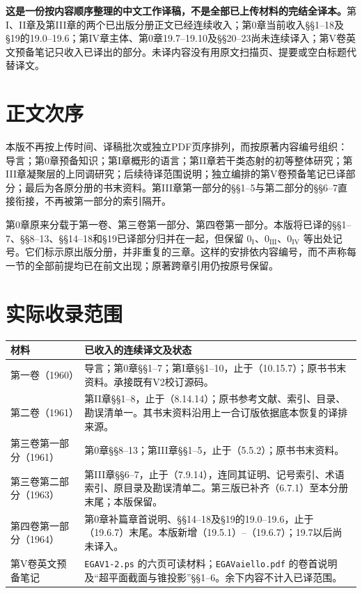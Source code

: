 \maketitle
{}
\noindent\textbf{这是一份按内容顺序整理的中文工作译稿，不是全部已上传材料的完结全译本。}第I、II章及第III章的两个已出版分册正文已经连续收入；第0章当前收入§§1--18及§19的19.0--19.6；第IV章主体、第0章19.7--19.10及§§20--23尚未连续译入；第V卷英文预备笔记只收入已译出的部分。未译内容没有用原文扫描页、提要或空白标题代替译文。

\section*{正文次序}
本版不再按上传时间、译稿批次或独立PDF页序排列，而按原著内容编号组织：导言；第0章预备知识；第I章概形的语言；第II章若干类态射的初等整体研究；第III章凝聚层的上同调研究；后续待译范围说明；独立编排的第V卷预备笔记已译部分；最后为各原分册的书末资料。第III章第一部分的§§1--5与第二部分的§§6--7直接衔接，不再被第一部分的索引隔开。

第0章原来分载于第一卷、第三卷第一部分、第四卷第一部分。本版将已译的§§1--7、§§8--13、§§14--18和§19已译部分归并在一起，但保留 $0_{\mathrm I}$、$0_{\mathrm{III}}$、$0_{\mathrm{IV}}$ 等出处记号。它们标示原出版分册，并非重复的三章。这样的安排依内容编号，而不声称每一节的全部前提均已在前文出现；原著跨章引用仍按原号保留。

\section*{实际收录范围}
\begin{longtable}{@{}p{.25\linewidth}p{.67\linewidth}@{}}
\toprule 材料 & 已收入的连续译文及状态\\\midrule\endhead
第一卷（1960） & 导言；第0章§§1--7；第I章§§1--10，止于（10.15.7）；原书书末资料。承接既有V2校订源码。\\
第二卷（1961） & 第II章§§1--8，止于（8.14.14）；原书参考文献、索引、目录、勘误清单一。其书末资料沿用上一合订版依据底本恢复的译排来源。\\
第三卷第一部分（1961） & 第0章§§8--13；第III章§§1--5，止于（5.5.2）；原书书末资料。\\
第三卷第二部分（1963） & 第III章§§6--7，止于（7.9.14），连同其证明、记号索引、术语索引、原目录及勘误清单二。第三版已补齐（6.7.1）至本分册末尾；本版保留。\\
第四卷第一部分（1964） & 第0章补篇章首说明、§§14--18及§19的19.0--19.6，止于（19.6.7）末尾。本版新增（19.5.1）--（19.6.7）；19.7以后尚未译入。\\
第V卷英文预备笔记 & \texttt{EGAV1-2.ps} 的六页可读材料；\texttt{EGAVaiello.pdf} 的卷首说明及“超平面截面与锥投影”§§1--6。余下内容不计入已译范围。\\
\bottomrule
\end{longtable}


